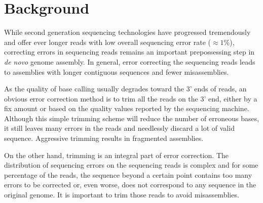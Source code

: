 \documentclass[10pt]{bmc_article}
\newenvironment{bmcformat}{\fussy\setboolean{publ}{true}}{\fussy}
\begin{document}
\begin{bmcformat}




\section*{Background}
While second generation sequencing technologies have progressed tremendously and offer ever longer reads with low overall sequencing error rate ($\approx 1\%$), correcting errors in sequencing reads remains an important prepossessing step in \emph{de novo} genome assembly.
In general, error correcting the sequencing reads leads to assemblies with longer contiguous sequences and fewer misassemblies.




As the quality of base calling usually degrades toward the 3' ends of reads, an obvious error correction method is to trim all the reads on the 3' end, either by a fix amount or based on the quality values reported by the sequencing machine.
Although this simple trimming scheme will reduce the number of erroneous bases, it still leaves many errors in the reads and needlessly discard a lot of valid sequence.
Aggressive trimming results in fragmented assemblies.

On the other hand, trimming is an integral part of error correction.
The distribution of sequencing errors on the sequencing reads is complex and for some percentage of the reads, the sequence beyond a certain point contains too many errors to be corrected or, even worse, does not correspond to any sequence in the original genome.
It is important to trim those reads to avoid misassemblies.


\end{bmcformat}
\end{document}
